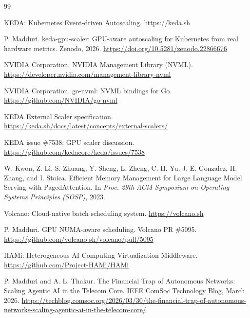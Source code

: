 \documentclass[11pt]{article}
\begin{document}
\begin{thebibliography}{99}

 KEDA: Kubernetes Event-driven Autoscaling. \url{https://keda.sh}

 P. Madduri. keda-gpu-scaler: GPU-aware autoscaling for Kubernetes
from real hardware metrics. Zenodo, 2026. \url{https://doi.org/10.5281/zenodo.22866676}

 NVIDIA Corporation. NVIDIA Management Library (NVML).
\url{https://developer.nvidia.com/management-library-nvml}

 NVIDIA Corporation. go-nvml: NVML bindings for Go.
\url{https://github.com/NVIDIA/go-nvml}

 KEDA External Scaler specification.
\url{https://keda.sh/docs/latest/concepts/external-scalers/}

 KEDA issue \#7538: GPU scaler discussion.
\url{https://github.com/kedacore/keda/issues/7538}

 W. Kwon, Z. Li, S. Zhuang, Y. Sheng, L. Zheng, C. H. Yu,
J. E. Gonzalez, H. Zhang, and I. Stoica. Efficient Memory Management for Large
Language Model Serving with PagedAttention. In \emph{Proc. 29th ACM Symposium on
Operating Systems Principles (SOSP)}, 2023.

 Volcano: Cloud-native batch scheduling system.
\url{https://volcano.sh}

 P. Madduri. GPU NUMA-aware scheduling. Volcano PR \#5095.
\url{https://github.com/volcano-sh/volcano/pull/5095}

 HAMi: Heterogeneous AI Computing Virtualization Middleware.
\url{https://github.com/Project-HAMi/HAMi}

 P. Madduri and A. L. Thakur. The Financial Trap of Autonomous
Networks: Scaling Agentic AI in the Telecom Core. IEEE ComSoc Technology Blog,
March 2026.
\url{https://techblog.comsoc.org/2026/03/30/the-financial-trap-of-autonomous-networks-scaling-agentic-ai-in-the-telecom-core/}

\end{thebibliography}
\end{document}

